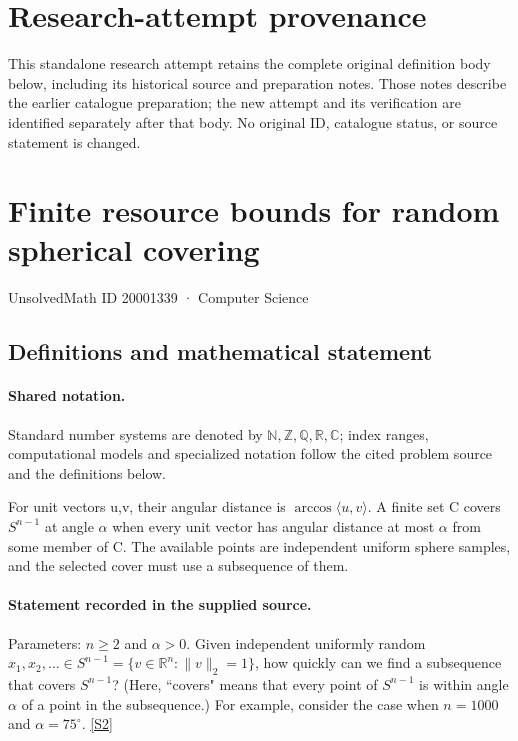 \documentclass[11pt]{article}
\begin{document}
\section*{Research-attempt provenance}
This standalone research attempt retains the complete original definition body below,
including its historical source and preparation notes. Those notes describe the
earlier catalogue preparation; the new attempt and its verification are identified
separately after that body. No original ID, catalogue status, or source statement is changed.

\section{Finite resource bounds for random spherical covering}\label{20001339}
{\small UnsolvedMath ID 20001339 · Computer Science}
\subsection{Definitions and mathematical statement}

\paragraph{Shared notation.}Standard number systems are denoted by $\mathbb N,\mathbb Z,\mathbb Q,\mathbb R,\mathbb C$; index ranges, computational models and specialized notation follow the cited problem source and the definitions below.


For unit vectors u,v, their angular distance is $\arccos\langle u,v\rangle$. A finite set C covers $S^{n-1}$ at angle $\alpha$ when every unit vector has angular distance at most $\alpha$ from some member of C. The available points are independent uniform sphere samples, and the selected cover must use a subsequence of them.
\paragraph{Statement recorded in the supplied source.}
Parameters: $n \geq 2$ and $\alpha > 0$. Given independent uniformly random $x_1, x_2, \dots\in S^{n-1} = \{v \in \mathbb R^n : \|v\|_2 = 1\}$, how quickly can we find a subsequence that covers $S^{n-1}$? (Here, ``covers" means that every point of $S^{n-1}$ is within angle $\alpha$ of a point in the subsequence.) For example, consider the case when $n = 1000$ and $\alpha = 75^\circ$. \href{http://aimpl.org/quantumalg/6/}{[S2]}
\end{document}
